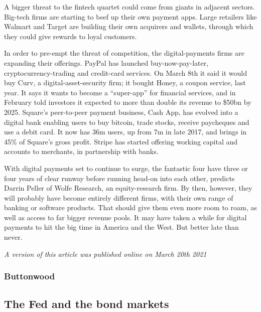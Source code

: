 \documentclass{article}
\begin{document}
A bigger threat to the fintech quartet could come from giants in adjacent sectors. Big-tech firms are starting to beef up their own payment apps. Large retailers like Walmart and Target are building their own acquirers and wallets, through which they could give rewards to loyal customers. 

In order to pre-empt the threat of competition, the digital-payments firms are expanding their offerings. PayPal has launched buy-now-pay-later, cryptocurrency-trading and credit-card services. On March 8th it said it would buy Curv, a digital-asset-security firm; it bought Honey, a coupon service, last year. It says it wants to become a ``super-app'' for financial services, and in February told investors it expected to more than double its revenue to \$50bn by 2025. Square's peer-to-peer payment business, Cash App, has evolved into a digital bank enabling users to buy bitcoin, trade stocks, receive paycheques and use a debit card. It now has 36m users, up from 7m in late 2017, and brings in 45\% of Square's gross profit. Stripe has started offering working capital and accounts to merchants, in partnership with banks. 

With digital payments set to continue to surge, the fantastic four have three or four years of clear runway before running head-on into each other, predicts Darrin Peller of Wolfe Research, an equity-research firm. By then, however, they will probably have become entirely different firms, with their own range of banking or software products. That should give them even more room to roam, as well as access to far bigger revenue pools. It may have taken a while for digital payments to hit the big time in America and the West. But better late than never. {} 

\emph{A version of this article was published online on March 20th 2021} 
\clearpage
\subsubsection{Buttonwood }
\subsection{The Fed and the bond markets }
\end{document}
